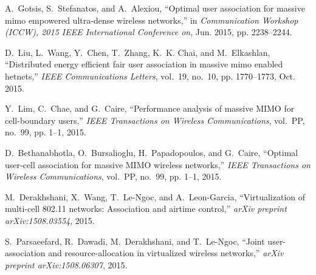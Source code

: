 \documentclass[conference]{IEEEtran}
\begin{document}
\begin{thebibliography}{10}
	A.~Gotsis, S.~Stefanatos, and A.~Alexiou, ``Optimal user association for
	massive mimo empowered ultra-dense wireless networks,'' in
	\emph{Communication Workshop (ICCW), 2015 IEEE International Conference on},
	Jun. 2015, pp. 2238--2244.
	
	D.~Liu, L.~Wang, Y.~Chen, T.~Zhang, K.~K. Chai, and M.~Elkashlan, ``Distributed
	energy efficient fair user association in massive mimo enabled hetnets,''
	\emph{IEEE Communications Letters}, vol.~19, no.~10, pp. 1770--1773, Oct.
	2015.
	
	Y.~Lim, C.~Chae, and G.~Caire, ``Performance analysis of massive {MIMO} for
	cell-boundary users,'' \emph{IEEE Transactions on Wireless Communications},
	vol.~PP, no.~99, pp. 1--1, 2015.
	
	D.~Bethanabhotla, O.~Bursalioglu, H.~Papadopoulos, and G.~Caire, ``Optimal
	user-cell association for massive {MIMO} wireless networks,'' \emph{IEEE
		Transactions on Wireless Communications}, vol.~PP, no.~99, pp. 1--1, 2015.
	
	M.~Derakhshani, X.~Wang, T.~Le-Ngoc, and A.~Leon-Garcia, ``Virtualization of
	multi-cell 802.11 networks: Association and airtime control,'' \emph{arXiv
		preprint arXiv:1508.03554}, 2015.
	
	S.~Parsaeefard, R.~Dawadi, M.~Derakhshani, and T.~Le-Ngoc, ``Joint
	user-association and resource-allocation in virtualized wireless networks,''
	\emph{arXiv preprint arXiv:1508.06307}, 2015.
	
\end{thebibliography}
\end{document}
